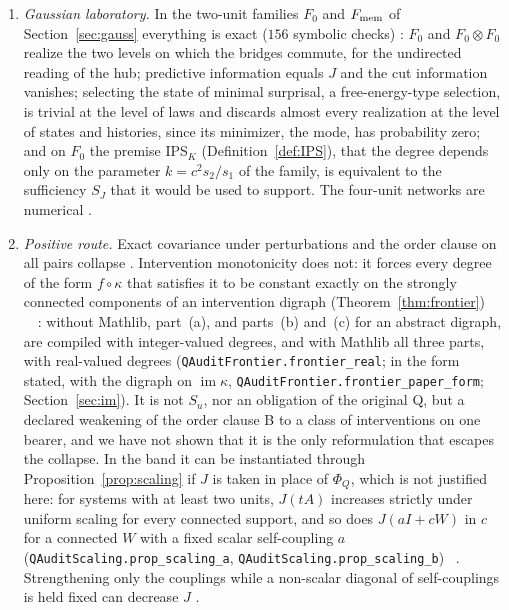 \begin{enumerate}
\item[(R6)] \emph{Gaussian laboratory.} In the two-unit families $F_0$ and $F_{\rm mem}$ of Section~\ref{sec:gauss} everything is exact ($156$ symbolic checks) \stS: $F_0$ and $F_0\otimes F_0$ realize the two levels on which the bridges commute, for the undirected reading of the hub; predictive information equals $J$ and the cut information vanishes; selecting the state of minimal surprisal, a free-energy-type selection, is trivial at the level of laws and discards almost every realization at the level of states and histories, since its minimizer, the mode, has probability zero; and on $F_0$ the premise IPS$_K$ (Definition~\ref{def:IPS}), that the degree depends only on the parameter $k=c^2s_2/s_1$ of the family, is equivalent to the sufficiency $S_J$ that it would be used to support. The four-unit networks are numerical \stN.
\item[(R7)] \emph{Positive route.} Exact covariance under perturbations and the order clause on all pairs collapse \stL. Intervention monotonicity does not: it forces every degree of the form $f\circ\kappa$ that satisfies it to be constant exactly on the strongly connected components of an intervention digraph (Theorem~\ref{thm:frontier}) \stA\ \stL\ \stM: without Mathlib, part~(a), and parts~(b) and~(c) for an abstract digraph, are compiled with integer-valued degrees, and with Mathlib all three parts, with real-valued degrees (\texttt{QAuditFrontier.\allowbreak frontier\_real}; in the form stated, with the digraph on $\operatorname{im}\kappa$, \texttt{QAuditFrontier.\allowbreak frontier\_paper\_form}; Section~\ref{sec:im}). It is not $S_u$, nor an obligation of the original Q, but a declared weakening of the order clause B to a class of interventions on one bearer, and we have not shown that it is the only reformulation that escapes the collapse. In the band it can be instantiated through Proposition~\ref{prop:scaling} if $J$ is taken in place of $\Phi_Q$, which is not justified here: for systems with at least two units, $J(tA)$ increases strictly under uniform scaling for every connected support, and so does $J(aI+cW)$ in $c$ for a connected $W$ with a fixed scalar self-coupling $a$ (\texttt{QAuditScaling.\allowbreak prop\_scaling\_a}, \texttt{QAuditScaling.\allowbreak prop\_scaling\_b}) \stA\ \stM. Strengthening only the couplings while a non-scalar diagonal of self-couplings is held fixed can decrease $J$ \stS.
\end{enumerate}

